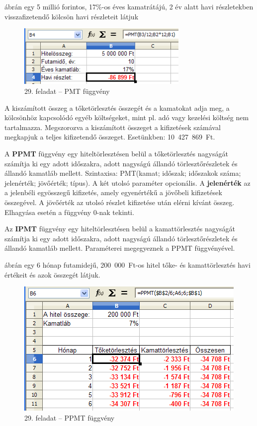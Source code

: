  ábrán egy 5 millió forintos, 17\%-os éves
kamatrátájú, 2 év alatt havi részletekben visszafizetendő
kölcsön havi részleteit látjuk

\begin{figure}[!h]
\begin{center}
\includegraphics[width=8.206cm]{oocalcv1-img127.png}
\caption{29.  feladat --  PMT függvény}\label{29-feladatPMT}
\end{center}
\end{figure}

A kiszámított összeg a tőketörlesztés összegét és a
kamatokat adja meg, a kölcsönhöz kapcsolódó egyéb
költségeket, mint pl. adó vagy kezelési költség nem
tartalmazza. Megszorozva a kiszámított összeget a kifizetések
számával megkapjuk a teljes kifizetendő összeget.
Esetünkben:  10~427~869~Ft.

A \textbf{PPMT} függvény egy hiteltörlesztésen belül a
tőketörlesztés nagyságát számítja ki egy adott
időszakra, adott nagyságú állandó
törlesztőrészletek és állandó kamatláb mellett.
Szintaxisa: PMT(kamat; időszak; időszakok száma;
jelenérték; jövőérték; típus). A két utolsó
paraméter opcionális.  A \textbf{jelenérték} az a jelenbéli
egyösszegű kifizetés, amely egyenértékű a
jövőbeli kifizetések összegével. A jövőérték az
utolsó részlet kifizetése után elérni kívánt összeg.
Elhagyása esetén a függvény 0-nak tekinti.

Az \textbf{IPMT} függvény egy hiteltörlesztésen belül a
kamattörlesztés nagyságát számítja ki egy adott
időszakra, adott nagyságú állandó
törlesztőrészletek és állandó kamatláb mellett.
Paraméterei megegyeznek a PPMT függvényével.

 ábrán egy 6 hónap futamidejű, 200~000~Ft-os hitel
tőke- és kamattörlesztés havi értékeit és azok összegét látjuk.

\begin{figure}[!h]
\begin{center}
\includegraphics[width=11.137cm]{oocalcv1-img128.png}
\caption{29.  feladat --  PPMT függvény}\label{29-feladatPPMT}
\end{center}
\end{figure}


